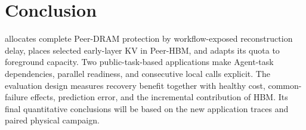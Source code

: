 \section{Conclusion}\label{sec:conclusion}

\system allocates complete Peer-DRAM protection by workflow-exposed
reconstruction delay, places selected early-layer KV in Peer-HBM, and
adapts its quota to foreground capacity. Two public-task-based applications
make Agent-task dependencies, parallel readiness, and consecutive local
calls explicit. The evaluation design measures recovery benefit together
with healthy cost, common-failure effects, prediction error, and the
incremental contribution of HBM. Its final quantitative conclusions will
be based on the new application traces and paired physical campaign.
